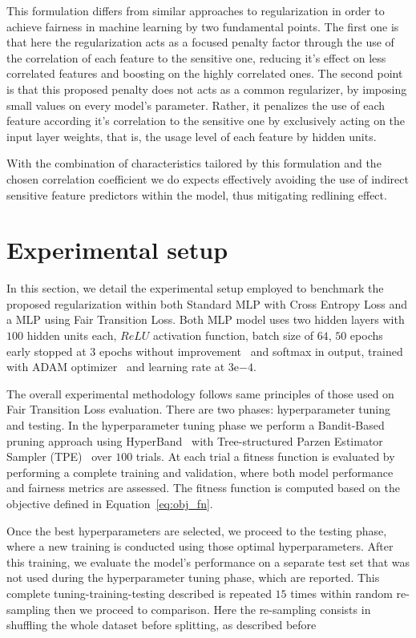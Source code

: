 This formulation differs from similar approaches to regularization in order to achieve fairness in machine learning by two fundamental points.  The first one is that here the regularization acts as a focused penalty factor through the use of the correlation of each feature to the sensitive one, reducing it's effect on less correlated features and boosting on the highly correlated ones. The second point is that this proposed penalty does not acts as a common regularizer, by imposing small values on every model's parameter. Rather, it penalizes the use of each feature according it's correlation to the sensitive one by exclusively acting on the input layer weights, that is, the usage level of each feature by hidden units.

With the combination of characteristics tailored by this formulation and the chosen correlation coefficient we do expects effectively avoiding the use of indirect sensitive feature predictors within the model, thus mitigating redlining effect.

\section{Experimental setup}

In this section, we detail the experimental setup employed to benchmark the proposed regularization within both Standard MLP with Cross Entropy Loss and a MLP using Fair Transition Loss. Both MLP model uses two hidden layers with $100$ hidden units each, $ReLU$ activation function, batch size of $64$, $50$ epochs early stopped at $3$ epochs without improvement~\citep{Li2020} and softmax in output, trained with ADAM optimizer~\citep{KingmaB14} and learning rate at $3\mathrm{e}{-4}$. 

The overall experimental methodology follows same principles of those used on Fair Transition Loss evaluation. There are two phases: hyperparameter tuning and testing. In the hyperparameter tuning phase we perform a Bandit-Based pruning approach using HyperBand~\citep{Li2018} with Tree-structured Parzen Estimator Sampler (TPE)~\citep{bergstra2011} over $100$ trials. At each trial a fitness function is evaluated by performing a complete training and validation, where both model performance and fairness metrics are assessed. The fitness function is computed based on the objective defined in Equation~\ref{eq:obj_fn}. 

Once the best hyperparameters are selected, we proceed to the testing phase, where a new training is conducted using those optimal hyperparameters. After this training, we evaluate the model's performance on a separate test set that was not used during the hyperparameter tuning phase, which are reported. This complete tuning-training-testing described is repeated $15$ times within random re-sampling then we proceed to comparison. Here the re-sampling consists in shuffling the whole dataset before splitting, as described before

